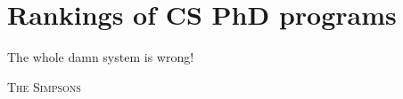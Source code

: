 \documentclass[oneside,11pt,dvipsnames]{book}
\newenvironment{commentbox}[1][]{
  \small
  \begin{mybox}
    {\small \textbf{#1}}
  }{
  \end{mybox}
}
\begin{document}
  



\chapter{Rankings of CS PhD programs}\label{sec:ranking}

\epigraph{\vspace{-0.2in} The whole damn system is wrong!}{\textsc{The Simpsons}}
\end{document}
